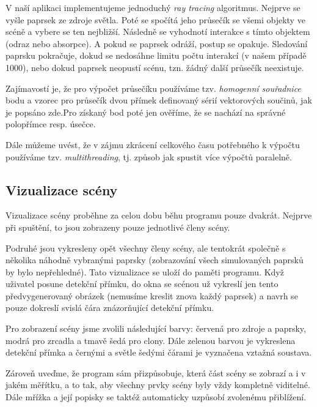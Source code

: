 V naší aplikaci implementujeme jednoduchý \emph{ray tracing} algoritmus. Nejprve se vyšle paprsek ze zdroje světla. Poté se spočítá jeho průsečík se všemi objekty ve scéně a vybere se ten nejbližší. Následně se vyhodnotí interakce s tímto objektem (odraz nebo absorpce). A pokud se paprsek odráží, postup se opakuje. Sledování paprsku pokračuje, dokud se nedosáhne limitu počtu interakcí (v našem případě 1000), nebo dokud paprsek neopustí scénu, tzn. žádný další průsečík neexistuje.

Zajímavostí je, že pro výpočet průsečíku používáme tzv. \emph{homogenní souřadnice} bodu a vzorec pro průsečík dvou přímek definovaný sérií vektorových součinů, jak je popsáno zde.\src Pro získaný bod poté jen ověříme, že se nachází na správné polopřímce resp. úsečce.

Dále můžeme uvést, že v zájmu zkrácení celkového času potřebného k výpočtu používáme tzv. \emph{multithreading}, tj. způsob jak spustit více výpočtů paralelně.

\subsection{Vizualizace scény}

Vizualizace scény proběhne za celou dobu běhu programu pouze dvakrát. Nejprve při spuštění, to jsou zobrazeny pouze jednotlivé členy scény.


Podruhé jsou vykresleny opět všechny členy scény, ale tentokrát společně s několika náhodně vybranými paprsky (zobrazování všech simulovaných paprsků by bylo nepřehledné). Tato vizualizace se uloží do paměti programu. Když uživatel posune detekční přímku, do okna se scénou už vykreslí jen tento předvygenerovaný obrázek (nemusíme kreslit znova každý paprsek) a navrh se pouze dokreslí svislá čára znázorňující detekční přímku.


Pro zobrazení scény jsme zvolili následující barvy: červená pro zdroje a paprsky, modrá pro zrcadla a tmavě šedá pro clony. Dále zelenou barvou je vykreslena detekční přímka a černými a světle šedými čárami je vyznačena vztažná soustava.

Zároveň uveďme, že program sám přizpůsobuje, která část scény se zobrazí a i v jakém měřítku, a to tak, aby všechny prvky scény byly vždy kompletně viditelné. Dále mřížka a její popisky se taktéž automaticky uzpůsobí zvolenému přiblížení.

